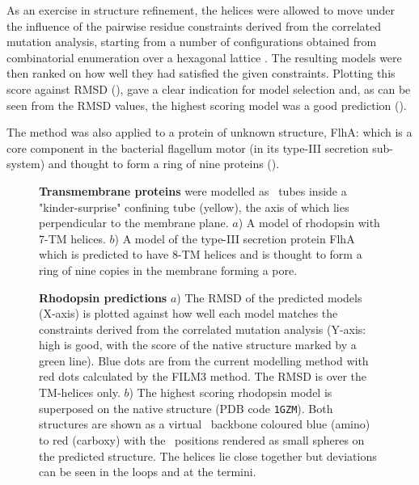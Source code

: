 As an exercise in structure refinement, the helices were allowed to move
under the influence of the pairwise residue constraints derived from the
correlated mutation analysis, starting from a number of configurations
obtained from combinatorial enumeration over a hexagonal lattice \cite{TaylorWRet94a}.
The resulting models were then ranked on how well they had satisfied the
given constraints.  Plotting this score against RMSD (),
gave a clear indication for model selection and, as can be seen from the
RMSD values, the highest scoring model was a good prediction ().

The method was also applied to a protein of unknown structure, FlhA: which is
a core component in the bacterial flagellum motor (in its type-III secretion 
sub-system) and thought to form a ring of nine proteins ().

\begin{figure}
\centering
{}
\caption{
\label{Fig:TMmodels}
{\bf Transmembrane proteins} were modelled as \AH\ tubes inside a "kinder-surprise"
confining tube (yellow), the axis of which lies perpendicular to the membrane plane.
$a$) A model of rhodopsin with 7-TM helices.
$b$) A model of the type-III secretion protein FlhA which is predicted to have 8-TM helices
and is thought to form a ring of nine copies in the membrane forming a pore.
}
\end{figure}

\begin{figure}
\centering
{}
\caption{
\label{Fig:rhod-pred}
{\bf Rhodopsin predictions}
$a$) The RMSD of the predicted models (X-axis) is plotted against how well each model matches
the constraints derived from the correlated mutation analysis (Y-axis: high is good, with
the score of the native structure marked by a green line).
Blue dots are from the current modelling method with red dots calculated by the FILM3
method.  The RMSD is over the TM-helices only.
$b$) The highest scoring rhodopsin model is superposed on the native structure (PDB code {\tt 1GZM}).
Both structures are shown as a virtual \CA\ backbone coloured blue (amino) to red (carboxy)
with the \CA\ positions rendered as small spheres on the predicted structure.
The helices lie close together but deviations can be seen in the loops and at the termini.
}
\end{figure}


